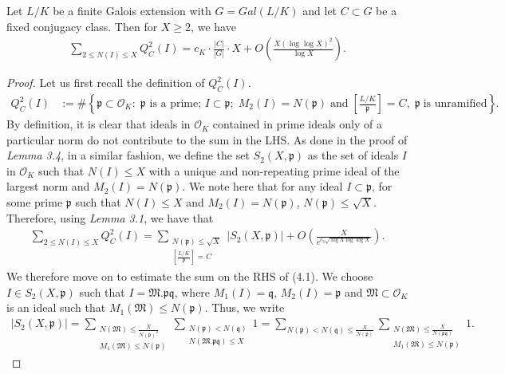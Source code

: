 \documentclass[10pt,a4paper]{amsart}
\begin{document}
\begin{theorem}
    Let $L/K$ be a finite Galois extension with $G=Gal(L/K)$ and let $C \subset G$ be a fixed conjugacy class. Then for $X\geq 2$, we have
    \begin{align}
         \sum_{2 \leq N(I)\leq X} Q^2_C(I) = c_K\cdot \frac{|C|}{|G|}\cdot X + O\left(\frac{X(\log\log X)^2}{\log X}\right). \nonumber
    \end{align}
    \end{theorem}

    \begin{proof}
        Let us first recall the definition of $Q^2_C(I)$.
        \begin{align}
             Q_C^2(I) &:= \# \left\{\mathfrak{p} \subset \mathcal{O}_K :\; \mathfrak{p}\text{ is a prime; } I\subset \mathfrak{p}; \;M_2(I)=N(\mathfrak{p})\;\text{and}\;\left[\frac{L/K}{\mathfrak{p}}\right]=C,\;\mathfrak{p}\;\text{is unramified}\right\} .\nonumber
        \end{align}
        By definition, it is clear that ideals in $\mathcal{O}_K$ contained in prime ideals only of a particular norm do not contribute to the sum in the LHS. As done in the proof of \textit{Lemma 3.4}, in a similar fashion, we define the set $S_2(X,\mathfrak{p})$ as the set of ideals $I$ in $\mathcal{O}_K$ such that $N(I) \leq X$ with a unique and non-repeating prime ideal of the largest norm and $M_2(I)=N(\mathfrak{p})$. We note here that for any ideal $I \subset \mathfrak{p}$, for some prime $\mathfrak{p}$ such that $N(I)\leq X$ and $M_2(I)=N(\mathfrak{p})$, $N(\mathfrak{p}) \leq \sqrt{X}$. Therefore, using \textit{Lemma 3.1}, we have that
        \begin{align}
             \sum_{2\leq N(I)\leq X} Q_C^2(I) = \sum_{\substack{N(\mathfrak{p})\leq \sqrt{X} \\ \left[\frac{L/K}{\mathfrak{p}}\right]=C}} |S_2(X,\mathfrak{p})| +  O\left(\frac{X}{e^{c_3\sqrt{\log X\log\log X}}}\right).
        \end{align}
        We therefore move on to estimate the sum on the RHS of (4.1). We choose $I \in S_2(X,\mathfrak{p})$ such that $I=\mathfrak{M.pq}$, where $M_1(I)=\mathfrak{q}$, $M_2(I)=\mathfrak{p}$ and $\mathfrak{M} \subset \mathcal{O}_K$ is an ideal such that $M_1(\mathfrak{M})\leq N(\mathfrak{p})$. Thus, we write
        \begin{align}
            |S_2(X,\mathfrak{p})| = \sum_{\substack{N(\mathfrak{M}) \leq \frac{X}{N(\mathfrak{p})^2} \\ M_1(\mathfrak{M}) \leq N(\mathfrak{p})}} \sum_{\substack{N(\mathfrak{p})<N(\mathfrak{q}) \\ N(\mathfrak{M.pq}) \leq X}} 1 = \sum_{N(\mathfrak{p})<N(\mathfrak{q})\leq \frac{X}{N(\mathfrak{p})}} \sum_{\substack{N(\mathfrak{M})\leq \frac{X}{N(\mathfrak{pq})} \\ M_1(\mathfrak{M}) \leq N(\mathfrak{p})}} 1 .

\end{align}
\end{proof}
\end{document}
